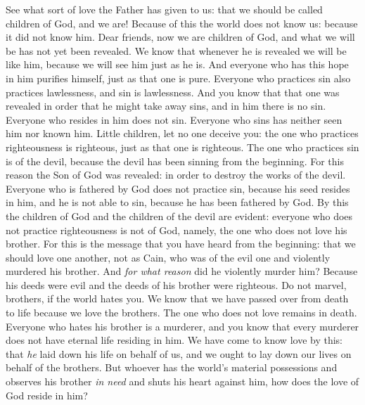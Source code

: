 \begin{biblechapter} %
\verse See what sort of love the Father has given to us: that we should be called children of God, and we are! Because of this the world does not know us: because it did not know him.
\verse Dear friends, now we are children of God, and what we will be has not yet been revealed. We know that whenever he is revealed we will be like him, because we will see him just as he is.
\verse And everyone who has this hope in him purifies himself, just as that one is pure.
\verse Everyone who practices sin also practices lawlessness, and sin is lawlessness.
\verse And you know that that one was revealed in order that he might take away sins, and in him there is no sin.
\verse Everyone who resides in him does not sin. Everyone who sins has neither seen him nor known him.
\verse Little children, let no one deceive you: the one who practices righteousness is righteous, just as that one is righteous.
\verse The one who practices sin is of the devil, because the devil has been sinning from the beginning. For this reason the Son of God was revealed: in order to destroy the works of the devil.
\verse Everyone who is fathered by God does not practice sin, because his seed resides in him, and he is not able to sin, because he has been fathered by God.
\verse By this the children of God and the children of the devil are evident: everyone who does not practice righteousness is not of God, namely, the one who does not love his brother.
 For this is the message that you have heard from the beginning: that we should love one another,
\verse not as Cain, who was of the evil one and violently murdered his brother. And \textit{for what reason} did he violently murder him? Because his deeds were evil and the deeds of his brother were righteous.
\verse Do not marvel, brothers, if the world hates you.
\verse We know that we have passed over from death to life because we love the brothers. The one who does not love remains in death.
\verse Everyone who hates his brother is a murderer, and you know that every murderer does not have eternal life residing in him.
\verse We have come to know love by this: that \textit{he} laid down his life on behalf of us, and we ought to lay down our lives on behalf of the brothers.
\verse But whoever has the world’s material possessions and observes his brother \textit{in need} and shuts his heart against him, how does the love of God reside in him?

\end{biblechapter}

